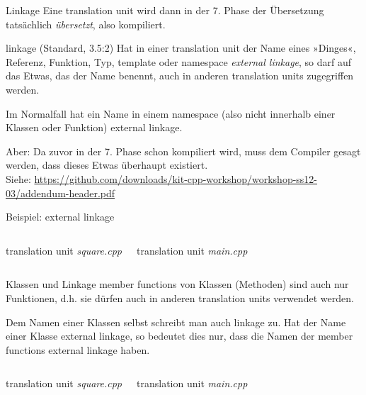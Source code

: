 \begin{frame}{Linkage}
	Eine translation unit wird dann in der 7. Phase der Übersetzung tatsächlich \emph{übersetzt}, also kompiliert.
	
	\vspace{1em}
	
	\begin{block}{linkage (Standard, 3.5:2)}
		Hat in einer translation unit der Name eines »Dinges«, Referenz, Funktion, Typ, template oder namespace \emph{external linkage}, so darf auf das Etwas, das der Name benennt, auch in anderen translation units zugegriffen werden.
	\end{block}
	Im Normalfall hat ein Name in einem namespace (also nicht innerhalb einer Klassen oder Funktion) external linkage.
	
	\vspace{1em}
	\pause
	
	Aber: Da zuvor in der 7. Phase schon kompiliert wird, muss dem Compiler gesagt werden, dass dieses Etwas überhaupt existiert.\\
	\tiny
	Siehe: \url{https://github.com/downloads/kit-cpp-workshop/workshop-ss12-03/addendum-header.pdf}
\end{frame}

\begin{frame}{Beispiel: external linkage}
	\footnotesize
	\begin{columns}[t]
		translation unit \emph{square.cpp}
		\vspace{1em}
		
		
		\pause
		
		translation unit \emph{main.cpp}
		\vspace{1em}
		
	\end{columns}
\end{frame}

\begin{frame}{Klassen und Linkage}
	member functions von Klassen (Methoden) sind auch nur Funktionen, d.h. sie dürfen auch in anderen translation units verwendet werden.
	
	Dem Namen einer Klassen selbst schreibt man auch linkage zu. Hat der Name einer Klasse external linkage, so bedeutet dies nur, dass die Namen der member functions external linkage haben.
	
	\pause
	\vspace{1em}
	
	\footnotesize
	\begin{columns}[t]
		translation unit \emph{square.cpp}
		\vspace{1em}
		
		
		\pause
		translation unit \emph{main.cpp}
		\vspace{1em}
		
	\end{columns}
\end{frame}

